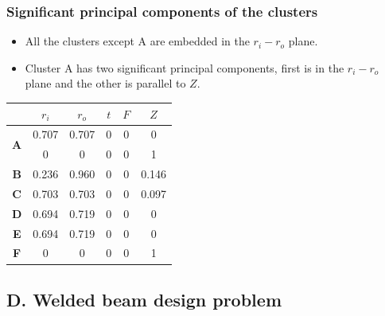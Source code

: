 \documentclass[svgnames, table, smaller]{beamer}
\begin{document}
\begin{frame}

  \frametitle{Significant principal components of the clusters}

  \begin{itemize}
  \item All the clusters except A are embedded in the $r_i-r_o$ plane.
  \item Cluster A has two significant principal components, first is in the 
    $r_i-r_o$ plane and the other is parallel to  $Z$.
    
  \end{itemize}



  \begin{table}[!ht]
    \centering
    \begin{tabular}{c|c|c|c|c|c|}
      \cline{2-6}
      & $r_{i}$ & $r_{o}$ & $ t $  & $F$ & $Z$ \\
      \hline
      \multicolumn{1}{|c|}{\multirow{2}{*}{\textbf{A}}} & 0.707 & 0.707 & 0 & 0 & 0\\ \cline{2-6}
      \multicolumn{1}{|c|}{}& 0 & 0 & 0 & 0 & 1\\
      \hline
      \multicolumn{1}{|c|}{\textbf{B}} & 0.236 & 0.960 & 0 & 0 & 0.146\\
      \hline
      \multicolumn{1}{|c|}{\textbf{C}} & 0.703 & 0.703 & 0 & 0 & 0.097\\
      \hline
      \multicolumn{1}{|c|}{\textbf{D}} & 0.694 & 0.719 & 0 & 0 & 0\\
      \hline
      \multicolumn{1}{|c|}{\textbf{E}} & 0.694 & 0.719 & 0 & 0 & 0\\
      \hline
      \multicolumn{1}{|c|}{\textbf{F}} & 0 & 0 & 0 & 0 & 1\\
      \hline
    \end{tabular}
    \label{first2clutchPCs}
  \end{table}


\end{frame}


\subsection{D. Welded beam design problem}
\end{document}

